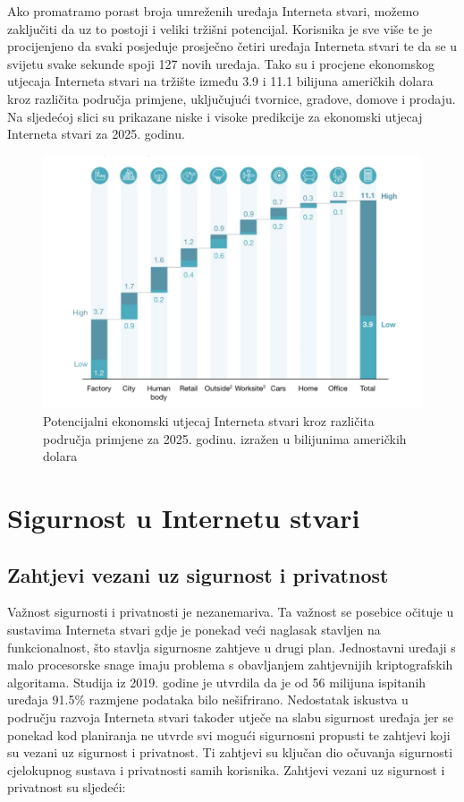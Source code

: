 \documentclass[times, utf8, diplomski]{fer}
\begin{document}
Ako promatramo porast broja umreženih uređaja Interneta stvari, možemo zaključiti da uz to postoji i veliki tržišni potencijal. Korisnika je sve više te je procijenjeno da svaki posjeduje prosječno četiri uređaja Interneta stvari te da se u svijetu svake sekunde spoji 127 novih uređaja. Tako su i procjene ekonomskog utjecaja Interneta stvari na tržište između 3.9 i 11.1 bilijuna američkih dolara kroz različita područja primjene, uključujući tvornice, gradove, domove i prodaju\citep{Patel2018Jan}. Na sljedećoj slici su prikazane niske i visoke predikcije za ekonomski utjecaj Interneta stvari za 2025. godinu.
\begin{figure}[H]
    \centering
    \includegraphics[width=12cm]{images/iot-economic-impact.png}
    \caption{Potencijalni ekonomski utjecaj Interneta stvari kroz različita područja primjene za 2025. godinu. izražen u bilijunima američkih dolara\citep{Patel2018Jan}}
    \label{fig:market}
\end{figure}

\chapter{Sigurnost u Internetu stvari}
\section{Zahtjevi vezani uz sigurnost i privatnost}
Važnost sigurnosti i privatnosti je nezanemariva. Ta važnost se posebice očituje u sustavima Interneta stvari gdje je ponekad veći naglasak stavljen na funkcionalnost, što stavlja sigurnosne zahtjeve u drugi plan. Jednostavni uređaji s malo procesorske snage imaju problema s obavljanjem zahtjevnijih kriptografskih algoritama. Studija iz 2019. godine je utvrdila da je od 56 milijuna ispitanih uređaja 91.5\% razmjene podataka bilo nešifrirano\citep{Greene2019May}. Nedostatak iskustva u području razvoja Interneta stvari također utječe na slabu sigurnost uređaja jer se ponekad kod planiranja ne utvrde svi mogući sigurnosni propusti te zahtjevi koji su vezani uz sigurnost i privatnost. Ti zahtjevi su ključan dio očuvanja sigurnosti cjelokupnog sustava i privatnosti samih korisnika. Zahtjevi vezani uz sigurnost i privatnost su sljedeći\citep{InternetStvari}:
\end{document}

